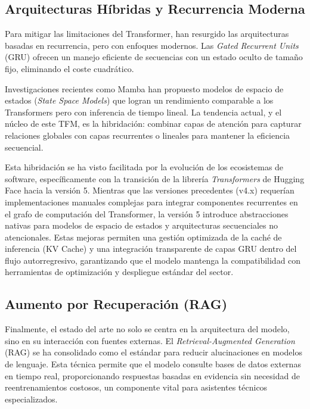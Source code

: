 \subsection{Arquitecturas Híbridas y Recurrencia Moderna}
Para mitigar las limitaciones del Transformer, han resurgido las arquitecturas basadas en recurrencia, pero con enfoques modernos. Las \textit{Gated Recurrent Units} (GRU) \cite{cho2014learning} ofrecen un manejo eficiente de secuencias con un estado oculto de tamaño fijo, eliminando el coste cuadrático. 

Investigaciones recientes como Mamba \cite{gu2023mamba} han propuesto modelos de espacio de estados (\textit{State Space Models}) que logran un rendimiento comparable a los Transformers pero con inferencia de tiempo lineal. La tendencia actual, y el núcleo de este TFM, es la hibridación: combinar capas de atención para capturar relaciones globales con capas recurrentes o lineales para mantener la eficiencia secuencial.

Esta hibridación se ha visto facilitada por la evolución de los ecosistemas de software, específicamente con la transición de la librería \textit{Transformers} de Hugging Face hacia la versión 5. Mientras que las versiones precedentes (v4.x) requerían implementaciones manuales complejas para integrar componentes recurrentes en el grafo de computación del Transformer, la versión 5 introduce abstracciones nativas para modelos de espacio de estados y arquitecturas secuenciales no atencionales. Estas mejoras permiten una gestión optimizada de la caché de inferencia (KV Cache) y una integración transparente de capas GRU dentro del flujo autorregresivo, garantizando que el modelo mantenga la compatibilidad con herramientas de optimización y despliegue estándar del sector.

\subsection{Aumento por Recuperación (RAG)}
Finalmente, el estado del arte no solo se centra en la arquitectura del modelo, sino en su interacción con fuentes externas. El \textit{Retrieval-Augmented Generation} (RAG) \cite{lewis2020rag} se ha consolidado como el estándar para reducir alucinaciones en modelos de lenguaje. Esta técnica permite que el modelo consulte bases de datos externas en tiempo real, proporcionando respuestas basadas en evidencia sin necesidad de reentrenamientos costosos, un componente vital para asistentes técnicos especializados.
